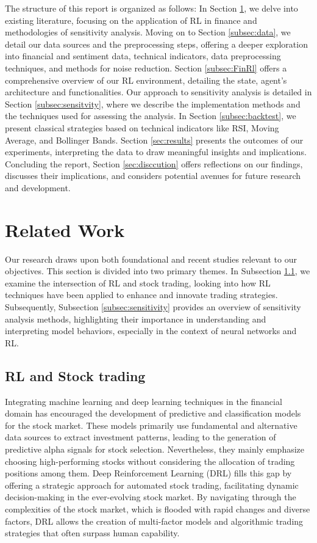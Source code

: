 \documentclass[12pt]{article}
\begin{document}
The structure of this report is organized as follows: In Section \ref{sec:related}, we delve into existing literature, focusing on the application of RL in finance and methodologies of sensitivity analysis. Moving on to Section \ref{subsec:data}, we detail our data sources and the preprocessing steps, offering a deeper exploration into financial and sentiment data, technical indicators, data preprocessing techniques, and methods for noise reduction. Section \ref{subsec:FinRl} offers a comprehensive overview of our RL environment, detailing the state, agent's architecture and functionalities. Our approach to sensitivity analysis is detailed in Section \ref{subsec:sensitvity}, where we describe the implementation methods and the techniques used for assessing the analysis. In Section \ref{subsec:backtest}, we present classical strategies
based on technical indicators like RSI, Moving Average, and Bollinger Bands. Section \ref{sec:results} presents the outcomes of our experiments, interpreting the data to draw meaningful insights and implications. Concluding the report, Section \ref{sec:disccution} offers reflections on our findings, discusses their implications, and considers potential avenues for future research and development.



\section{Related Work} %
\label{sec:related}
Our research draws upon both foundational and recent studies relevant to our objectives. This section is divided into two primary themes. In Subsection \ref{subsec:stockRL}, we examine the intersection of RL and stock trading, looking into how RL techniques have been applied to enhance and innovate trading strategies. Subsequently, Subsection \ref{subsec:sensitivity} provides an overview of sensitivity analysis methods, highlighting their importance in understanding and interpreting model behaviors, especially in the context of neural networks and RL.


\subsection{RL and Stock trading}%
\label{subsec:stockRL}
Integrating machine learning and deep learning techniques in the financial domain has encouraged the development of predictive and classification models for the stock market. These models primarily use fundamental and alternative data sources to extract investment patterns, leading to the generation of predictive alpha signals for stock selection. Nevertheless, they mainly emphasize choosing high-performing stocks without considering the allocation of trading positions among them. Deep Reinforcement Learning (DRL) fills this gap by offering a strategic approach for automated stock trading, facilitating dynamic decision-making in the ever-evolving stock market. By navigating through the complexities of the stock market, which is flooded with rapid changes and diverse factors, DRL allows the creation of multi-factor models and algorithmic trading strategies that often surpass human capability.
\end{document}
